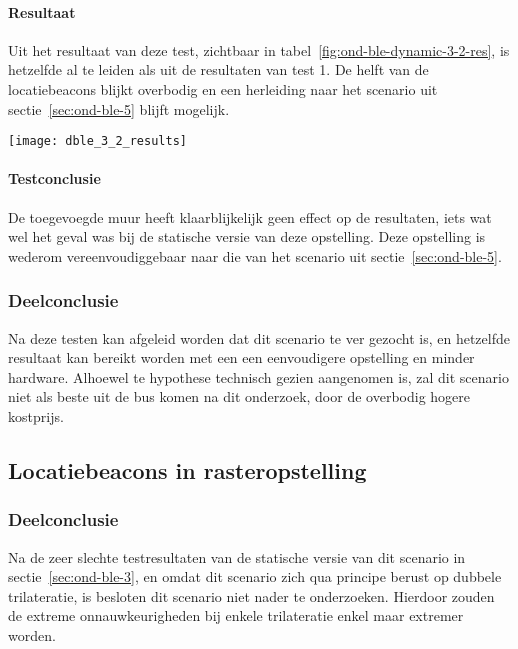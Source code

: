 \paragraph{Resultaat}
\begin{minipage}{0.42\textwidth}
Uit het resultaat van deze test, zichtbaar in tabel~\ref{fig:ond-ble-dynamic-3-2-res}, is hetzelfde al te leiden als uit de resultaten van test 1. De helft van de locatiebeacons blijkt overbodig en een herleiding naar het scenario uit sectie~\ref{sec:ond-ble-5} blijft mogelijk.
\end{minipage}
\hfill
\begin{minipage}{0.55\textwidth}
	\texttt{[image: dble\_3\_2\_results]}
	\label{fig:ond-ble-dynamic-3-2-res}
\end{minipage}

\paragraph{Testconclusie}
De toegevoegde muur heeft klaarblijkelijk geen effect op de resultaten, iets wat wel het geval was bij de statische versie van deze opstelling. Deze opstelling is wederom vereenvoudiggebaar naar die van het scenario uit sectie~\ref{sec:ond-ble-5}.

\subsubsection{Deelconclusie}
Na deze testen kan afgeleid worden dat dit scenario te ver gezocht is, en hetzelfde resultaat kan bereikt worden met een een eenvoudigere opstelling en minder hardware. Alhoewel te hypothese technisch gezien aangenomen is, zal dit scenario niet als beste uit de bus komen na dit onderzoek, door de overbodig hogere kostprijs.

\subsection{Locatiebeacons in rasteropstelling}
\label{sec:ond-ble-7}
\subsubsection{Deelconclusie}
Na de zeer slechte testresultaten van de statische versie van dit scenario in sectie~\ref{sec:ond-ble-3}, en omdat dit scenario zich qua principe berust op dubbele trilateratie, is besloten dit scenario niet nader te onderzoeken. Hierdoor zouden de extreme onnauwkeurigheden bij enkele trilateratie enkel maar extremer worden. 

